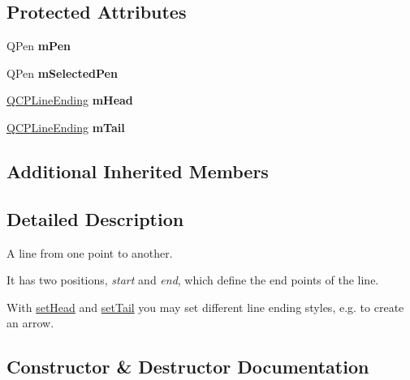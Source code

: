 \subsection*{Protected Attributes}
\begin{DoxyCompactItemize}
\item 
\mbox{\label{class_q_c_p_item_line_abbb544d5bb927dfe4e81a7f3ca4c65ac}} 
Q\+Pen {\bfseries m\+Pen}
\item 
\mbox{\label{class_q_c_p_item_line_aff858ad6dde3b90024814ca4b116f278}} 
Q\+Pen {\bfseries m\+Selected\+Pen}
\item 
\mbox{\label{class_q_c_p_item_line_a51603f28ab7ddb1c1a95ea384791d3ed}} 
\hyperlink{class_q_c_p_line_ending}{Q\+C\+P\+Line\+Ending} {\bfseries m\+Head}
\item 
\mbox{\label{class_q_c_p_item_line_ab8ed61dfe15bbb1cbf9b95eae95e242f}} 
\hyperlink{class_q_c_p_line_ending}{Q\+C\+P\+Line\+Ending} {\bfseries m\+Tail}
\end{DoxyCompactItemize}
\subsection*{Additional Inherited Members}


\subsection{Detailed Description}
A line from one point to another. 

 It has two positions, {\itshape start} and {\itshape end}, which define the end points of the line.

With \hyperlink{class_q_c_p_item_line_aebf3d687114d584e0459db6759e2c3c3}{set\+Head} and \hyperlink{class_q_c_p_item_line_ac264222c3297a7efe33df9345c811a5f}{set\+Tail} you may set different line ending styles, e.\+g. to create an arrow. 

\subsection{Constructor \& Destructor Documentation}
\mbox{\label{class_q_c_p_item_line_a17804b7f64961c6accf25b61e85142e3}} 
